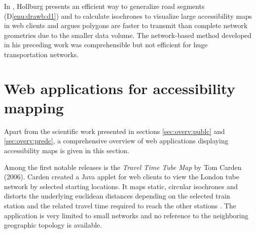    In \cite{Hollburg2014}, Hollburg
    presents an efficient way to generalize road segments (D\ref{enu:drawb:d1})
    and to calculate isochrones to visualize large accessibility maps in web
    clients and argues polygons are faster to transmit than complete network
    geometries due to the smaller data volume. The network-based method
    developed in his preceding work was comprehensible but not efficient for
    huge transportation networks.\par

  \section{Web applications for accessibility mapping}
    \label{sec:overv:applc}

    Apart from the scientific work presented in sections \ref{sec:overv:publc}
    and \ref{sec:overv:predc}, a comprehensive overview of web applications
    displaying accessibility maps is given in this section.\par

    Among the first notable releases is the \textit{Travel Time Tube Map} by Tom
    Carden (2006). Carden created a Java applet for web clients to view the
    London tube network by selected starting locations. It maps static, circular
    isochrones and distorts the underlying euclidean distances depending on the
    selected train station and the related travel time required to reach the
    other stations \cite{Carden2006}. The application is very limited to small
    networks and no reference to the neighboring geographic topology is
    available.\par

